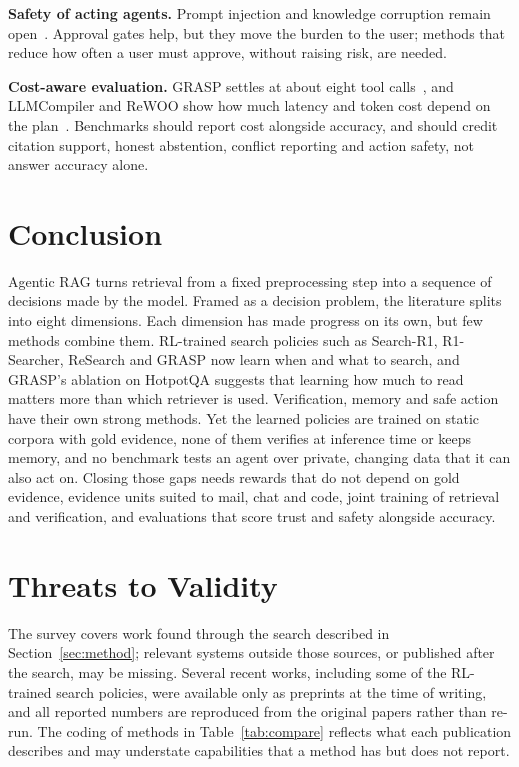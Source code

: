 \documentclass[pdflatex,sn-mathphys-num]{sn-jnl}%
\begin{document}
\textbf{Safety of acting agents.} Prompt injection and knowledge corruption remain open~\cite{zhan2024injecagent,debenedetti2024agentdojo,zou2025poisonedrag}. Approval gates help, but they move the burden to the user; methods that reduce how often a user must approve, without raising risk, are needed.

\textbf{Cost-aware evaluation.} GRASP settles at about eight tool calls~\cite{gandhi2026grasp}, and LLMCompiler and ReWOO show how much latency and token cost depend on the plan~\cite{kim2024llmcompiler,xu2023rewoo}. Benchmarks should report cost alongside accuracy, and should credit citation support, honest abstention, conflict reporting and action safety, not answer accuracy alone.

\section{Conclusion}
\label{sec:conclusion}

Agentic RAG turns retrieval from a fixed preprocessing step into a sequence of decisions made by the model. Framed as a decision problem, the literature splits into eight dimensions. Each dimension has made progress on its own, but few methods combine them. RL-trained search policies such as Search-R1, R1-Searcher, ReSearch and GRASP now learn when and what to search, and GRASP's ablation on HotpotQA suggests that learning how much to read matters more than which retriever is used. Verification, memory and safe action have their own strong methods. Yet the learned policies are trained on static corpora with gold evidence, none of them verifies at inference time or keeps memory, and no benchmark tests an agent over private, changing data that it can also act on. Closing those gaps needs rewards that do not depend on gold evidence, evidence units suited to mail, chat and code, joint training of retrieval and verification, and evaluations that score trust and safety alongside accuracy.

\section*{Threats to Validity}
The survey covers work found through the search described in Section~\ref{sec:method}; relevant systems outside those sources, or published after the search, may be missing. Several recent works, including some of the RL-trained search policies, were available only as preprints at the time of writing, and all reported numbers are reproduced from the original papers rather than re-run. The coding of methods in Table~\ref{tab:compare} reflects what each publication describes and may understate capabilities that a method has but does not report.
\end{document}
